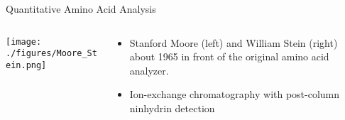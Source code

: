 \documentclass[presentation, smaller]{beamer}
\begin{document}
\begin{frame}[label={sec:orgheadline3}]{Quantitative Amino Acid Analysis}
\begin{columns}
\begin{column}{0.5\columnwidth}
\texttt{[image: ./figures/Moore\_Stein.png]}
\end{column}

\begin{column}{0.5\columnwidth}
\begin{itemize}
\item Stanford Moore (left) and William Stein (right) about 1965 in front
of the original amino acid analyzer.
\item Ion-exchange chromatography with post-column ninhydrin detection
\end{itemize}
\end{column}
\end{columns}
\end{frame}
\end{document}

